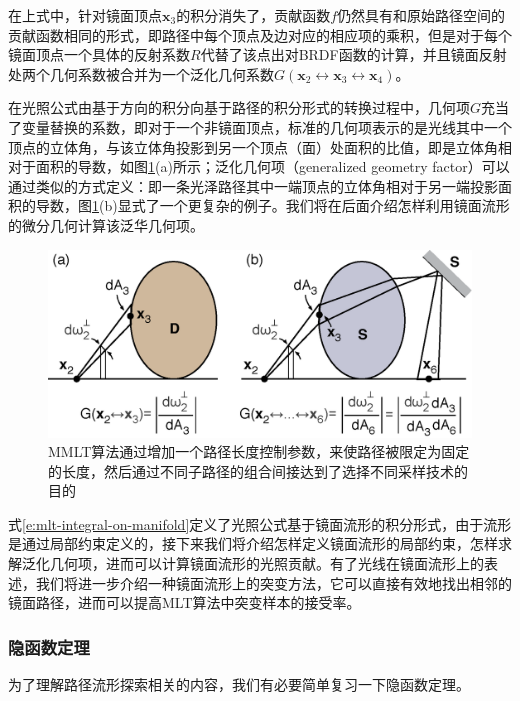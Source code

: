 \noindent 在上式中，针对镜面顶点$\mathbf{x}_3$的积分消失了，贡献函数$f$仍然具有和原始路径空间的贡献函数相同的形式，即路径中每个顶点及边对应的相应项的乘积，但是对于每个镜面顶点一个具体的反射系数$R$代替了该点出对BRDF函数的计算，并且镜面反射处两个几何系数被合并为一个泛化几何系数$G(\mathbf{x}_2\leftrightarrow\mathbf{x}_3\leftrightarrow\mathbf{x}_4)$。

在光照公式由基于方向的积分向基于路径的积分形式的转换过程中，几何项$G$充当了变量替换的系数，即对于一个非镜面顶点，标准的几何项表示的是光线其中一个顶点的立体角，与该立体角投影到另一个顶点（面）处面积的比值，即是立体角相对于面积的导数，如图\ref{f:mlt-generalized-geometry-factor}(a)所示；泛化几何项（generalized geometry factor）可以通过类似的方式定义：即一条光泽路径其中一端顶点的立体角相对于另一端投影面积的导数，图\ref{f:mlt-generalized-geometry-factor}(b)显式了一个更复杂的例子。我们将在后面介绍怎样利用镜面流形的微分几何计算该泛华几何项。

\begin{figure}
	\includegraphics[width=\textwidth]{figures/mlt/generalized-geometry-factor}
	\caption{MMLT算法通过增加一个路径长度控制参数，来使路径被限定为固定的长度，然后通过不同子路径的组合间接达到了选择不同采样技术的目的}
	\label{f:mlt-generalized-geometry-factor}
\end{figure}

式\ref{e:mlt-integral-on-manifold}定义了光照公式基于镜面流形的积分形式，由于流形是通过局部约束定义的，接下来我们将介绍怎样定义镜面流形的局部约束，怎样求解泛化几何项，进而可以计算镜面流形的光照贡献。有了光线在镜面流形上的表述，我们将进一步介绍一种镜面流形上的突变方法，它可以直接有效地找出相邻的镜面路径，进而可以提高MLT算法中突变样本的接受率。




\subsubsection{隐函数定理}\label{sec:mlt-implicit-function-throrem}
为了理解路径流形探索相关的内容，我们有必要简单复习一下隐函数定理。

